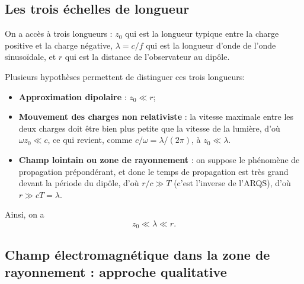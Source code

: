 \subsection{Les trois échelles de longueur}

On a accès à trois longueurs : $z_{0}$ qui est la longueur typique entre la charge positive et la charge négative, $\lambda=c/f$ qui est la longueur d'onde de l'onde sinusoïdale, et $r$ qui est la distance de l'observateur au dipôle.

Plusieurs hypothèses permettent de distinguer ces trois longueurs:
\begin{itemize}
    \item \textbf{Approximation dipolaire} : $z_{0}\ll r$;
    \item \textbf{Mouvement des charges non relativiste} : la vitesse maximale entre les deux charges doit être bien plus petite que la vitesse de la lumière, d'où $\omega z_{0}\ll c$, ce qui revient, comme $c/\omega = \lambda/(2\pi)$, à $z_{0}\ll\lambda$.
    \item \textbf{Champ lointain ou zone de rayonnement} : on suppose le phénomène de propagation prépondérant, et donc le temps de propagation est très grand devant la période du dipôle, d'où $r/c\gg T$ (c'est l'inverse de l'ARQS), d'où $r\gg cT=\lambda$.
\end{itemize}

Ainsi, on a
\begin{equation*}
    \boxed{
        z_{0}\ll \lambda\ll r.
    }
\end{equation*}

\subsection{Champ électromagnétique dans la zone de rayonnement : approche qualitative}